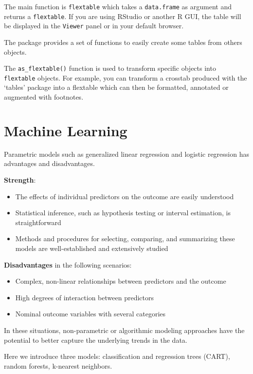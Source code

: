 \documentclass[
  a4paper,
  twoside,
  openright]{book}
\providecommand{\tightlist}{%
  \setlength{\itemsep}{0pt}\setlength{\parskip}{0pt}}
\theoremstyle{definition}
\theoremstyle{definition}
\theoremstyle{definition}
\theoremstyle{definition}
\theoremstyle{remark}
\begin{document}
The main function is \texttt{flextable} which takes a \texttt{data.frame} as argument and returns a \texttt{flextable}. If you are using RStudio or another R GUI, the table will be displayed in the \texttt{Viewer} panel or in your default browser.

The package provides a set of functions to easily create some tables from others objects.

The \texttt{as\_flextable()} function is used to transform specific objects into \texttt{flextable} objects. For example, you can transform a crosstab produced with the `tables' package into a flextable which can then be formatted, annotated or augmented with footnotes.

\chapter{Machine Learning}\label{machine-learning}

Parametric models such as generalized linear regression and logistic regression has advantages and disadvantages.

\textbf{Strength}:

\begin{itemize}
\tightlist
\item
  The effects of individual predictors on the outcome are easily understood
\item
  Statistical inference, such as hypothesis testing or interval estimation, is straightforward
\item
  Methods and procedures for selecting, comparing, and summarizing these models are well-established and extensively studied
\end{itemize}

\textbf{Disadvantages} in the following scenarios:

\begin{itemize}
\tightlist
\item
  Complex, non-linear relationships between predictors and the outcome
\item
  High degrees of interaction between predictors
\item
  Nominal outcome variables with several categories
\end{itemize}

In these situations, non-parametric or algorithmic modeling approaches have the potential to better capture the underlying trends in the data.

Here we introduce three models: classification and regression trees (CART), random forests, k-nearest neighbors.
\end{document}
